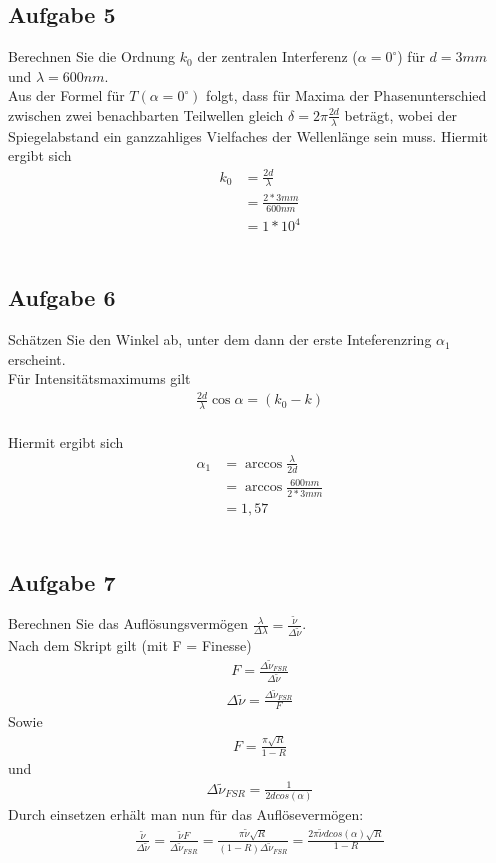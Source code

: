 \documentclass[a4paper,10pt]{scrartcl}
\begin{document}
	\subsection{Aufgabe 5} 
	Berechnen Sie die Ordnung $k_0$ der zentralen Interferenz ($\alpha=0^\circ$) für $d=3mm$ und $\lambda =600nm$.
	\\Aus der Formel für $T(\alpha=0^\circ)$ folgt, dass für Maxima der Phasenunterschied zwischen zwei benachbarten Teilwellen gleich $\delta=2\pi \frac{2d}{\lambda}$ beträgt, wobei der Spiegelabstand ein ganzzahliges Vielfaches der Wellenlänge sein muss. Hiermit ergibt sich
	\begin{align*}
	k_0 &= \frac{2d}{\lambda}
	\\ &= \frac{2*3mm}{600nm}
	\\ &= 1*10^4
	\end{align*}\\
	\subsection{Aufgabe 6}
	Schätzen Sie den Winkel ab, unter dem dann der erste Inteferenzring ${\alpha}_1$ erscheint.
	\\Für Intensitätsmaximums gilt
	\begin{align*}
	\frac{2d}{\lambda}\cos\alpha=(k_{0}-k)
	\end{align*}
	\\Hiermit ergibt sich
	\begin{align*}
	{\alpha}_1 &=\arccos \frac{\lambda}{2d}
	\\ &=\arccos \frac{600nm}{2*3mm}
	\\ &=1,57
	\end{align*}\\
	\subsection{Aufgabe 7}
	Berechnen Sie das Auflösungsvermögen $\frac{\lambda}{\Delta\lambda}=\frac{\tilde{\nu}}{\Delta\tilde{\nu}}$.\\
	Nach dem Skript gilt (mit F = Finesse)
	\begin{align*}
	F=\frac{\Delta \tilde{\nu}_{FSR}}{\Delta \tilde{\nu}}
	\end{align*}
	\begin{align*}
	\Delta\tilde{\nu}=\frac{\Delta\tilde{\nu}_{FSR}}{F}
	\end{align*}
	Sowie
	\begin{align*}
	F=\frac{\pi\sqrt{R}}{1-R}
	\end{align*}
	und
	\begin{align*}
	\Delta\tilde{\nu}_{FSR}=\frac{1}{2dcos(\alpha)}
	\end{align*}
	Durch einsetzen erhält man nun für das Auflösevermögen:
	\begin{align*}
	\frac{\tilde{\nu}}{\Delta\tilde{\nu}}=\frac{\tilde{\nu}F}{\Delta\tilde{\nu}_{FSR}}=\frac{\pi\tilde{\nu}\sqrt{R}}{(1-R)\Delta\tilde{\nu}_{FSR}}=\frac{2\pi\tilde{\nu}dcos(\alpha)\sqrt{R}}{1-R}
	\end{align*}
	
\end{document}
